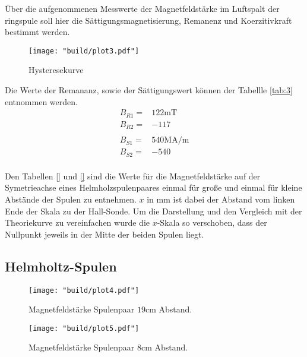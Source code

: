 Über die aufgenommenen Messwerte der Magnetfeldstärke im Luftspalt der ringspule soll hier 
die Sättigungsmagnetisierung, Remanenz und Koerzitivkraft bestimmt werden.
\begin{figure}[H]
    \caption{Hysteresekurve}
    \label{fig:3}
    \centering
    \texttt{[image: "build/plot3.pdf"]}
\end{figure}
Die Werte der Remananz, sowie der Sättigungswert können der Tabellle 
\autoref{tab:3} entnommen werden.
\begin{align*}
    B_{R1} =& 122 \unit{\milli\tesla}\\
    B_{R2} =& -117\\
&\\
    B_{S1} =& 540 \unit{\mega\ampere\per\meter}\\
    B_{S2} =& -540\\
\end{align*}





Den Tabellen \autoref{} und \autoref{} sind die Werte für die Magnetfeldstärke auf der 
Symetrieachse eines Helmholzspulenpaares einmal für große und einmal für kleine 
Abstände der Spulen zu entnehmen. $x$ in $\unit{\milli\meter} $ ist dabei der
Abstand vom linken Ende der Skala zu der Hall-Sonde. Um die Darstellung und den Vergleich mit der 
Theoriekurve zu vereinfachen wurde die $x$-Skala so verschoben, dass der Nullpunkt
jeweils in der Mitte der beiden Spulen liegt.

\subsection{Helmholtz-Spulen}

\begin{figure}
    \caption{Magnetfeldstärke Spulenpaar $19\unit{\centi\meter}$ Abstand.}
    \label{fig:4}
    \centering
    \texttt{[image: "build/plot4.pdf"]}
\end{figure}

\begin{figure}
    \caption{Magnetfeldstärke Spulenpaar $8\unit{\centi\meter}$ Abstand.}
    \label{fig:5}
    \centering
    \texttt{[image: "build/plot5.pdf"]}
\end{figure}